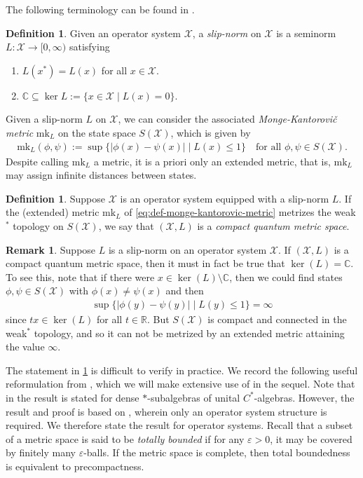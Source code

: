 \documentclass[11pt,a4paper,oneside,final,reqno]{amsart}
\theoremstyle{definition}
\newtheorem{definition}[lemma]{Definition}
\newtheorem{remark}[lemma]{Remark}
\newcommand{\cX}{\mathcal{X}}
\newcommand{\mk}{\mathrm{mk}}
\newcommand{\C}{\mathbb{C}}
\newcommand{\R}{\mathbb{R}}
\numberwithin{equation}{section}
\begin{document}
	
	The following terminology can be found in \cite{RieffelMartricialBridges2016}. 
	\begin{definition}\label{def:slip-norm}
		Given an operator system $\cX$, a \emph{slip-norm} on $\cX$ is a seminorm $L \colon \cX \to [0,\infty)$ satisfying
		\begin{enumerate}
			\item $L(x^*) = L(x)$ for all $x \in \cX$.
			\item $\C \subseteq \ker L := \{ x \in \cX \mid L(x) = 0 \}$. 
		\end{enumerate}
	\end{definition}
	Given a slip-norm $L$ on $\cX$, we can consider the associated \emph{Monge-Kantorovi\v{c} metric} $\mk_L$ on the state space $S(\cX)$, which is given by
	\begin{align}\label{eq:def-monge-kantorovic-metric}
		\mk_L (\phi, \psi) := \sup \{ \vert \phi(x) - \psi(x) \vert \mid L(x) \leq 1  \} \quad \text{for all $\phi, \psi \in S(\cX)$.}
	\end{align}
	Despite calling $\mk_L$ a metric, it is a priori only an extended metric, that is, $\mk_L$ may assign infinite distances between states. 
	\begin{definition}\label{def:CQMS}
		Suppose $\cX$ is an operator system equipped with a slip-norm $L$. If the (extended) metric $\mk_L$ of \eqref{eq:def-monge-kantorovic-metric} metrizes the weak$^*$ topology on $S(\cX)$, we say that $(\cX, L)$ is a \emph{compact quantum metric space}. 
	\end{definition}
	
	\begin{remark}\label{remark:CQMS-implies-kernel-is-C}
		Suppose $L$ is a slip-norm on an operator system $\cX$. If $(\cX, L)$ is a compact quantum metric space, then it must in fact be true that $\ker (L) = \C$. To see this, note that if there were $x \in \ker (L) \setminus \C$, then we could find states $\phi, \psi \in S(\cX)$ with $\phi(x) \neq \psi(x)$ and then
		\begin{align*}
			\sup \{ \vert \phi(y) - \psi(y) \vert \mid L(y) \leq 1  \} = \infty 
		\end{align*}
		since $tx \in \ker(L)$ for all $t \in \R$. But $S(\cX)$ is compact and connected in the weak$^*$ topology, and so it can not be metrized by an extended metric attaining the value $\infty$. 
	\end{remark}

	The statement in \cref{def:CQMS} is difficult to verify in practice. 
	We record the following useful reformulation from \cite{OzawaRieffel2004}, which we will make extensive use of in the sequel. Note that in \cite{OzawaRieffel2004} the result is stated for dense $*$-subalgebras of unital $C^*$-algebras. However, the result and proof is based on \cite[Theorem 1.8]{RieffelMetricActionsCompactGroups1998}, wherein only an operator system structure is required. We therefore state the result for operator systems. Recall that a subset of a metric space is said to be \emph{totally bounded} if for any $\varepsilon >0$, it may be covered by finitely many $\varepsilon$-balls. If the metric space is complete, then total boundedness is equivalent to precompactness. 
\end{document}
